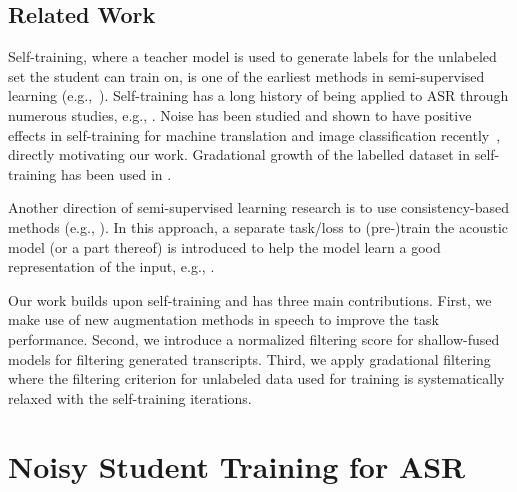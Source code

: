 \documentclass[a4paper]{article}
\begin{document}
\subsection{Related Work}

Self-training, where a teacher model is used to generate labels for the unlabeled set the student can train on, is one of the earliest methods in semi-supervised learning (e.g.,~\cite{scudder1965probability,yarowsky1995unsupervised,riloff2003learning}). Self-training has a long history of being applied to ASR through numerous studies, e.g., \cite{Zavaliagkos98utilizinguntranscribed,Novotney2009,Thomas2013,li2019,kahn2019selftraining,synnaeve2019endtoend,parthasarathi2019,hsu2020selfsupervised}. Noise has been studied and shown to have positive effects in self-training for machine translation and image classification recently~\cite{noisystudent,he2020revisiting}, directly motivating our work.
Gradational growth of the labelled dataset in self-training has been used in \cite{Lamel00lightlysupervised}.


Another direction of semi-supervised learning research is to use consistency-based methods (e.g., \cite{xie2019unsupervised,zhai2019s4l,sohn2020fixmatch}). In this approach, a separate task/loss to (pre-)train the acoustic model (or a part thereof) is introduced to help the model learn a good representation of the input, e.g., \cite{hsu2018extracting, chung2018speech2vec, chung2019autoregressive, chrowski2019unsupervised, schneider2019wav2vec, baevski2019vqwav2vec, ling2019deep}.

Our work builds upon self-training and has three main contributions. First, we make use of new augmentation methods in speech to improve the task performance. Second, we introduce a normalized filtering score for shallow-fused models for filtering generated transcripts. Third, we apply gradational filtering where the filtering criterion for unlabeled data used for training is systematically relaxed with the self-training iterations.


\section{Noisy Student Training for ASR}
\label{s:nst}
\end{document}
